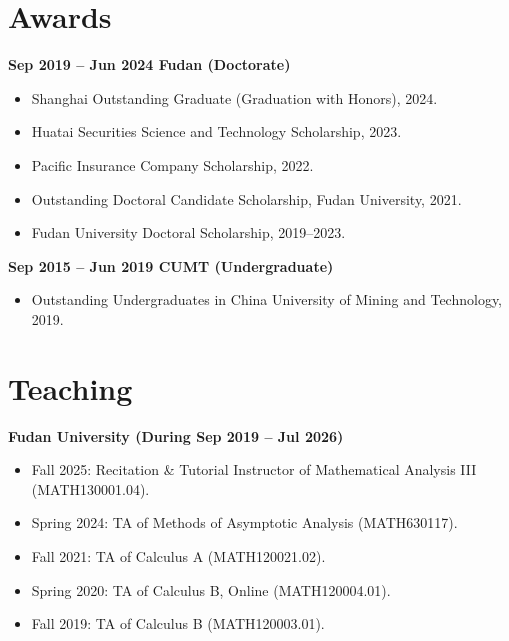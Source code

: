 \documentclass[12pt,a4paper]{article}
\begin{document}
\begin{cv}{}
\section{Awards}
\textbf{Sep 2019 -- Jun 2024 Fudan (Doctorate)}
\begin{itemize}
\item Shanghai Outstanding Graduate (Graduation with Honors), 2024.
    \item Huatai Securities Science and Technology Scholarship, 2023.
    \item Pacific Insurance Company Scholarship, 2022.
    \item Outstanding Doctoral Candidate Scholarship, Fudan University, 2021.
    \item Fudan University Doctoral Scholarship, 2019--2023.
\end{itemize}
\vspace{1em}

\noindent \textbf{Sep 2015 -- Jun 2019 CUMT (Undergraduate)}
\begin{itemize}
\item Outstanding Undergraduates in China University of Mining and Technology, 2019.
\end{itemize}


\section{Teaching}
\textbf{Fudan University (During Sep 2019 -- Jul 2026)}
\begin{itemize}
\item Fall 2025: Recitation \& Tutorial Instructor of Mathematical Analysis III (MATH130001.04).
\item Spring 2024: TA of Methods of Asymptotic Analysis (MATH630117).
\item Fall 2021: TA of Calculus A (MATH120021.02).
\item Spring 2020: TA of Calculus B, Online (MATH120004.01).
\item Fall 2019: TA of Calculus B (MATH120003.01).
\end{itemize}



\end{cv}
\end{document}
